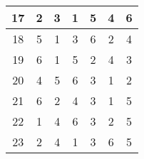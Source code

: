 \begin{table}[]
\begin{tabular}{|c|c|c|c|c|c|c|}
    17                                                       & 2                                                 & 3                                                 & 1                                                 & 5                                                 & 4                                                 & 6                                                 \\ \hline
    18                                                       & 5                                                 & 1                                                 & 3                                                 & 6                                                 & 2                                                 & 4                                                 \\ \hline
    19                                                       & 6                                                 & 1                                                 & 5                                                 & 2                                                 & 4                                                 & 3                                                 \\ \hline
    20                                                       & 4                                                 & 5                                                 & 6                                                 & 3                                                 & 1                                                 & 2                                                 \\ \hline
    21                                                       & 6                                                 & 2                                                 & 4                                                 & 3                                                 & 1                                                 & 5                                                 \\ \hline
    22                                                       & 1                                                 & 4                                                 & 6                                                 & 3                                                 & 2                                                 & 5                                                 \\ \hline
    23                                                       & 2                                                 & 4                                                 & 1                                                 & 3                                                 & 6                                                 & 5                                                 \\ \hline

\end{tabular}
\end{table}
